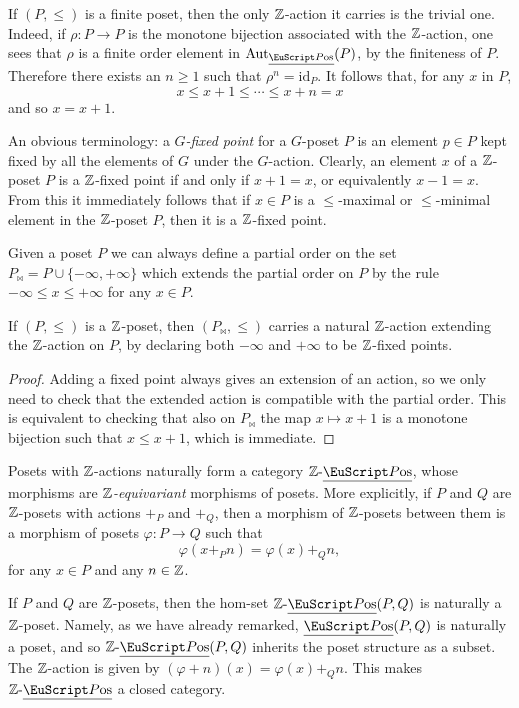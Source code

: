 \begin{remark}\label{rem.finite}
 If $(P,\leq)$ is a finite poset, then the only $\mathbb{Z}$-action it carries is the trivial one. Indeed, if $\rho\colon P\to P$ is the monotone bijection associated with the $\mathbb{Z}$-action, one sees that $\rho$ is a finite order element in $\mathrm{Aut}_{\Pos}(P)$, by the finiteness of $P$. Therefore there exists an $n\geq 1$ such that $\rho^n=\mathrm{id}_P$. It follows that, for any $x$ in $P$,
 \[
 x\leq x+1\leq\cdots\leq x+n=x
 \]
and so $x=x+1$.
\end{remark}
\begin{remark}\label{minmax}
An obvious terminology: a \emph{$G$-fixed point} for a $G$-poset $P$ is an element $p\in P$ kept fixed by all the elements of $G$ under the $G$-action. 
Clearly, an element $x$ of a $\mathbb{Z}$-poset $P$ is a $\mathbb{Z}$-fixed point if and only if $x+ 1 = x$, or equivalently $x-1=x$. From this it immediately follows that if $x\in P$ is a $\le$-maximal or $\le$-minimal element in the $\mathbb{Z}$-poset $P$, then it is a $\mathbb{Z}$-fixed point.
\end{remark}
\begin{remark}
Given a poset $P$ we can always define a partial order on the set $P_{\!\bowtie} = P\cup\{-\infty,+\infty\}$ which extends the partial order on $P$ by the rule $-\infty\leq x\leq +\infty$ for any $x\in P$. 
\end{remark}
\begin{lemma}
 If $(P,\leq)$ is a $\mathbb{Z}$-poset, then $(P_{\!\bowtie},\leq)$ carries a natural $\mathbb{Z}$-action extending the $\mathbb{Z}$-action on $P$, by declaring both $-\infty$ and $+\infty$ to be $\mathbb{Z}$-fixed points.
\end{lemma}
\begin{proof}
 Adding a fixed point always gives an extension of an action, so we only need to check that the extended action is compatible with the partial order. This is equivalent to checking that also on $P_{\!\bowtie}$ the map $x\mapsto x+1$ is a monotone bijection such that $x\leq x+1$, which is immediate. 
\end{proof}
Posets with $\mathbb{Z}$-actions naturally form a category $\ZPos$, whose morphisms are \emph{$\mathbb{Z}$-equivariant} morphisms of posets. More explicitly, if $P$ and $Q$ are $\mathbb{Z}$-posets with actions $+_P$ and $+_Q$, then a morphism of $\mathbb{Z}$-posets between them is a morphism of posets $\varphi\colon P\to Q$ such that
\[
\varphi(x+_P n)=\varphi(x)+_Q n,
\]
for any $x\in P$ and any $n\in \mathbb{Z}$.
\begin{remark}
If $P$ and $Q$ are $\mathbb{Z}$-posets, then the hom-set $\ZPos(P,Q)$ is naturally a $\mathbb{Z}$-poset. Namely, as we have already remarked, $\Pos(P,Q)$ is naturally a poset, and so $\ZPos(P,Q)$ inherits the poset structure as a subset. The $\mathbb{Z}$-action is given by $(\varphi+n)(x)=\varphi(x) +_Q n$. This makes $\ZPos$ a closed category.
\end{remark}


